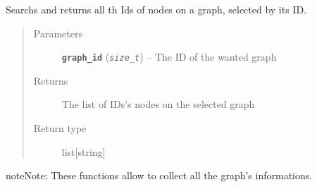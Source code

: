 \documentclass[letterpaper,10pt,english]{sphinxmanual}
\begin{document}
\begin{fulllineitems}
\label{doc:gedlibpy.get_original_node_ids}
Searchs and returns all th Ids of nodes on a graph, selected by its ID.
\begin{quote}\begin{description}
\item[{Parameters}] \leavevmode
\textbf{\texttt{graph\_id}} (\emph{\texttt{size\_t}}) -- The ID of the wanted graph

\item[{Returns}] \leavevmode
The list of IDs's nodes on the selected graph

\item[{Return type}] \leavevmode
list{[}string{]}

\end{description}\end{quote}

\begin{notice}{note}{Note:}
These functions allow to collect all the graph's informations.
\end{notice}

\end{fulllineitems}

\end{document}
